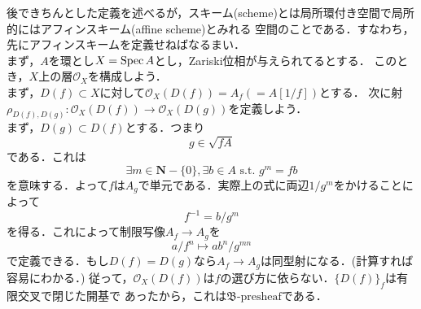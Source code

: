 
後できちんとした定義を述べるが，スキーム(scheme)とは局所環付き空間で局所的にはアフィンスキーム(affine scheme)とみれる
空間のことである．すなわち，先にアフィンスキームを定義せねばなるまい．\\
まず，$A$を環とし$X=\mathrm{Spec}\, A$とし，Zariski位相が与えられてるとする．
このとき，$X$上の層$\mathcal{O}_{X}$を構成しよう．\\
まず，$D(f)\subset X$に対して$\mathcal{O}_{X}(D(f)) = A_{f}(=A[1/f])$とする．
次に射$\rho_{D(f),D(g)}:\mathcal{O}_{X}(D(f)) \to \mathcal{O}_{X}(D(g))$を定義しよう．\\
まず，$D(g) \subset D(f)$とする．つまり
\begin{equation*}
  g\in \sqrt{fA}
\end{equation*}
である．これは
\begin{equation}
  \exists m \in \mathbf{N}-\{0\},\exists b\in A\text{ s.t. } g^{m} = fb
\end{equation}
を意味する．よって$f$は$A_{g}$で単元である．実際上の式に両辺$1/g^{m}$をかけることによって
\begin{equation*} 
  f^{-1} = b/g^{m}
\end{equation*}
を得る．これによって制限写像$A_{f} \to A_{g}$を
\begin{equation*}
  a/f^{n} \mapsto ab^{n}/g^{mn}
\end{equation*}
で定義できる．もし$D(f) = D(g)$なら$A_{f} \to A_{g}$は同型射になる．(計算すれば容易にわかる．)
従って，$\mathcal{O}_{X}(D(f))$は$f$の選び方に依らない．$\{D(f)\}_{f}$は有限交叉で閉じた開基で
あったから，これは$\mathfrak{B}\text{-presheaf}$である．
